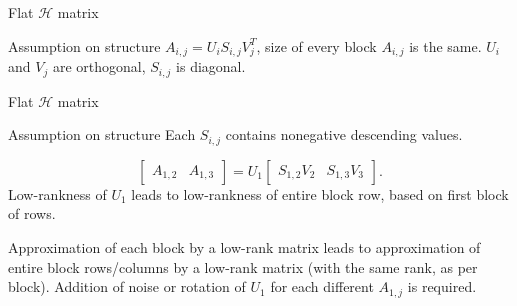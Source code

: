 \documentclass{beamer}
\begin{document}
\begin{frame}{Flat $\mathcal{H}$ matrix}
\begin{center}
\begin{block}{Assumption on structure}
$A_{i,j}=U_iS_{i,j}V_j^T$, size of every block $A_{i,j}$ is the same. $U_i$ and
$V_j$ are orthogonal, $S_{i,j}$ is diagonal.
\end{block}
\end{center}
\end{frame}

\begin{frame}{Flat $\mathcal{H}$ matrix}
\begin{block}{Assumption on structure}
Each $S_{i,j}$ contains nonegative descending values.
\end{block}
$$\begin{bmatrix} A_{1,2} & A_{1,3} \end{bmatrix} = U_1 \begin{bmatrix}
S_{1,2} V_2 & S_{1,3} V_3 \end{bmatrix}.$$
Low-rankness of $U_1$ leads to low-rankness of entire block row, based on first
block of rows.
\begin{alertblock}{}
Approximation of each block by a low-rank matrix leads to approximation of
entire block rows/columns by a low-rank matrix (with the same rank, as per
block). Addition of noise or rotation of $U_1$ for each different $A_{1,j}$ is
required.
\end{alertblock}
\end{frame}
\end{document}
